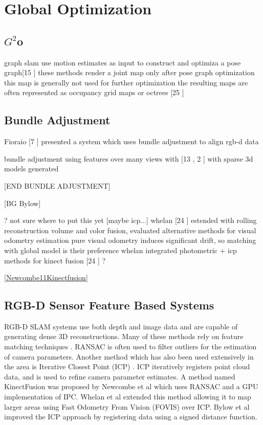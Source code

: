 \section{Global Optimization}
\subsection{$G^2$o}

graph slam use motion estimates as input to construct and optimiza a pose graph[15 \cite{Kummerle11G}] these methods render a joint map only after pose graph optimization
this map is generally not used for further optimization
the resulting maps are often represented as occupancy grid maps or octrees [25 \cite{Wurm10Octomap}]




\subsection{Bundle Adjustment}

Fioraio [7 \cite{Fioraio11Realtime}] presented a system which uses bundle adjustment to align rgb-d data


bundle adjustment using features over many views with [13 \cite{Klein07Parallel} , 2 \cite{Agarwal09Building}] with sparse 3d models generated

[END BUNDLE ADJUSTMENT]



[BG Bylow]

? not sure where to put this yet [maybe icp...]
whelan [24 \cite{Whelan13Robust}] estended with rolling reconstruction volume and color fusion, evaluated alternative methods for visual odometry estimation
pure visual odometry induces significant drift, so matching with global model is their preference
whelan integrated photometric + icp methods for kinect fusion [24 \cite{Whelan13Robust}]
?






\ref{Newcombe11Kinectfusion}

\subsection{RGB-D Sensor Feature Based Systems}
RGB-D SLAM systems use both depth and image data and are capable of generating dense 3D reconstructions. Many of these methods rely on feature matching techniques \cite{Engelhard11Real,Henry10Rgb,Endres12Evaluation}. RANSAC is often used to filter outliers for the estimation of camera parameters\cite{Engelhard11Real,Henry10Rgb,Endres12Evaluation}. Another method which has also been used extensively in the area is Iterative Closest Point (ICP) \cite{Engelhard11Real,Henry10Rgb,Bylow13Real,Newcombe11Kinectfusion,Stuckler12Robust,Izadi11Kinectfusion}. ICP iteratively registers point cloud data, and is used to refine camera parameter estimates. A method named KinectFusion was proposed by Newcombe et al \cite{Newcombe11Kinectfusion} which uses RANSAC and a GPU implementation of IPC. Whelan et al \cite{Whelan12Kintinuous} extended this method allowing it to map larger areas using Fast Odometry From Vision (FOVIS) over ICP. Bylow et al \cite{Bylow13Real} improved the ICP approach by registering data using a signed distance function.

